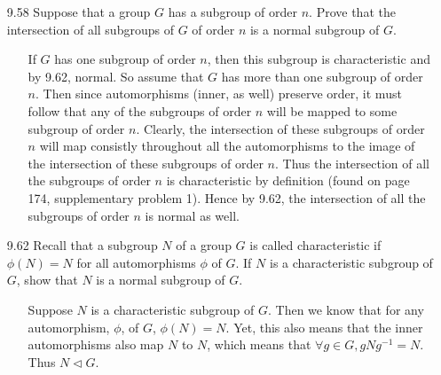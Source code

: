 \documentclass[12pt]{article}
\begin{document}
\begin{enumerate}
\item[9.58] Suppose that a group $G$ has a subgroup of order $n$. Prove that the intersection
of all subgroups of $G$ of order $n$ is a normal subgroup of $G$.
\begin{enumerate}
\item[] If $G$ has one subgroup of order $n$, then this subgroup is characteristic and by
9.62, normal. So assume that $G$ has more than one subgroup of order $n$. Then since automorphisms 
(inner, as well) preserve order, it must follow that any of the subgroups of order $n$ will be mapped 
to some subgroup of order $n$. Clearly, the intersection of these subgroups of order $n$ will map 
consistly throughout all the automorphisms to the image of the intersection of these subgroups of 
order $n$. Thus the intersection of all the subgroups of order $n$ is characteristic by definition 
(found on page 174, supplementary problem 1). Hence by 9.62, the intersection of all the subgroups
of order $n$ is normal as well.
\end{enumerate}

\item[9.62] Recall that a subgroup $N$ of a group $G$ is called characteristic if 
$\phi(N) = N$ for all automorphisms $\phi$ of $G$. If $N$ is a characteristic subgroup of $G$,
show that $N$ is a normal subgroup of $G$.
\begin{enumerate}
\item[] Suppose $N$ is a characteristic subgroup of $G$. Then we know that for any automorphism, 
$\phi$, of $G$, $\phi(N) = N$. Yet, this also means that the inner automorphisms also map $N$ to $N$,
which means that $\forall g \in G, gNg^{-1} = N$. Thus $N \lhd G$. 
\end{enumerate}


\end{enumerate}
\end{document}
